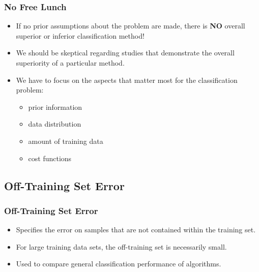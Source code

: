 \begin{frame}
  \frametitle{No Free Lunch \cont}


  \begin{itemize}
    \item If no prior assumptions about the problem are made, there is \textbf{NO} overall superior or inferior classification method! \pause
    \item We should be skeptical regarding studies that demonstrate the overall superiority of a particular method.\\[0.5cm] \pause
    \item We have to focus on the aspects that matter most for the classification problem:
      \begin{itemize}
        \item prior information
        \item data distribution
        \item amount of training data
        \item cost functions
      \end{itemize}
  \end{itemize}
\end{frame}



\subsection{Off-Training Set Error}

\begin{frame}
  \frametitle{Off-Training Set Error}

  
  \begin{itemize}
    \item Specifies the error on samples that are not contained within the training set.
    \item For large training data sets, the off-training set is necessarily small.
    \item Used to compare general classification performance of algorithms.
  \end{itemize}
\end{frame}


